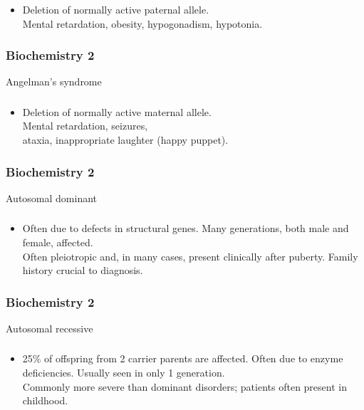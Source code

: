 \documentclass[11pt]{beamer}
\begin{document}
\begin{frame}
 \frametitle{}
\begin{itemize}
\item Deletion of normally active paternal allele. \\ Mental retardation, obesity, hypogonadism, hypotonia.
\end{itemize}
\end{frame}

\begin{frame}
 \frametitle{Biochemistry 2}
Angelman’s syndrome
\end{frame}

\begin{frame}
 \frametitle{}
\begin{itemize}
\item Deletion of normally active maternal allele. \\ Mental retardation, seizures, \\ ataxia, inappropriate laughter (happy puppet).
\end{itemize}
\end{frame}

\begin{frame}
 \frametitle{Biochemistry 2}
Autosomal dominant
\end{frame}

\begin{frame}
 \frametitle{}
\begin{itemize}
\item Often due to defects in structural genes. Many generations, both male and female, affected. \\ Often pleiotropic and, in many cases, present clinically after puberty. Family history crucial to diagnosis.
\end{itemize}
\end{frame}

\begin{frame}
 \frametitle{Biochemistry 2}
Autosomal recessive
\end{frame}

\begin{frame}
 \frametitle{}
\begin{itemize}
\item 25\% of offspring from 2 carrier parents are affected. Often due to enzyme deficiencies. Usually seen in only 1 generation. \\ Commonly more severe than dominant disorders; patients often present in childhood.
\end{itemize}
\end{frame}
\end{document}
